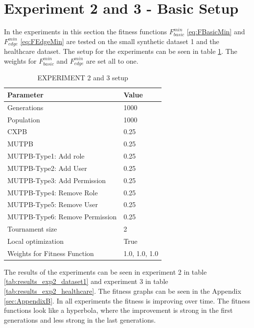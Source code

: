 \section{Experiment 2 and 3 - Basic Setup}
\label{sec:phase2}
In the experiments in this section the fitness functions $F_{basic}^{min}$ \eqref{eq:FBasicMin} and $F_{edge}^{min}$ \eqref{eq:FEdgeMin} are tested on the small synthetic dataset 1 and the healthcare dataset. The setup for the experiments can be seen in table \ref{tab:setup2}. The weights for $F_{basic}^{min}$ and $F_{edge}^{min}$ are set all to one.
\begin{table}[H]
    \centering
    \begin{tabular}{|l|l|}
        \hline
        \rowcolor{myGray} 
        \textbf{Parameter}              & \textbf{Value}    \\ \hline
        Generations                     & 1000              \\ \hline
        Population                      & 1000              \\ \hline
        CXPB                            & 0.25              \\ \hline
        MUTPB                           & 0.25              \\ \hline
        MUTPB-Type1: Add role           & 0.25              \\ \hline
        MUTPB-Type2: Add User           & 0.25              \\ \hline
        MUTPB-Type3: Add Permission     & 0.25              \\ \hline
        MUTPB-Type4: Remove Role        & 0.25              \\ \hline
        MUTPB-Type5: Remove User        & 0.25              \\ \hline
        MUTPB-Type6: Remove Permission  & 0.25              \\ \hline
        Tournament size                 & 2                 \\ \hline
        Local optimization              & True              \\ \hline
        Weights for Fitness Function    & 1.0, 1.0, 1.0     \\ \hline
    \end{tabular}
    \caption{EXPERIMENT 2 and 3 setup}
    \label{tab:setup2}
\end{table}
The results of the experiments can be seen in experiment 2 in table \ref{tab:results_exp2_dataset1} and experiment 3 in table \ref{tab:results_exp2_healthcare}. The fitness graphs can be seen in the Appendix \ref{sec:AppendixB}. In all experiments the fitness is improving over time. The fitness functions look like a hyperbola, where the improvement is strong in the first generations and less strong in the last generations.\\
